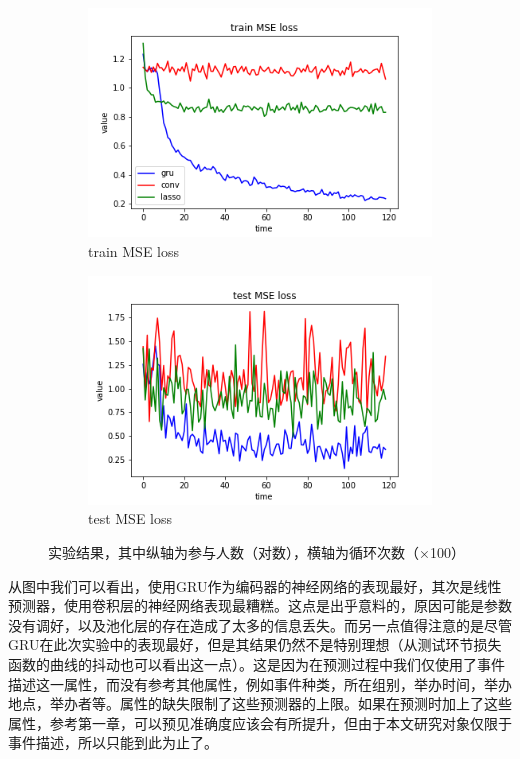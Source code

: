 \documentclass[12pt]{template}
\begin{document}
\begin{figure}[htb]
	\centering
	\begin{subfigure}{.49\textwidth}
		\includegraphics[width=\textwidth]{trainloss.png}
		\caption{train MSE loss}
	\end{subfigure}
	\begin{subfigure}{.49\textwidth}
		\includegraphics[width=\textwidth]{testloss.png}
		\caption{test MSE loss}
	\end{subfigure}
    \caption{实验结果，其中纵轴为参与人数（对数），横轴为循环次数（×100）}
    \label{f24}
\end{figure} 
从图中我们可以看出，使用GRU作为编码器的神经网络的表现最好，其次是线性预测器，使用卷积层的神经网络表现最糟糕。这点是出乎意料的，原因可能是参数没有调好，以及池化层的存在造成了太多的信息丢失。而另一点值得注意的是尽管GRU在此次实验中的表现最好，但是其结果仍然不是特别理想（从测试环节损失函数的曲线的抖动也可以看出这一点）。这是因为在预测过程中我们仅使用了事件描述这一属性，而没有参考其他属性，例如事件种类，所在组别，举办时间，举办地点，举办者等。属性的缺失限制了这些预测器的上限。如果在预测时加上了这些属性，参考第一章，可以预见准确度应该会有所提升，但由于本文研究对象仅限于事件描述，所以只能到此为止了。 
\end{document}
